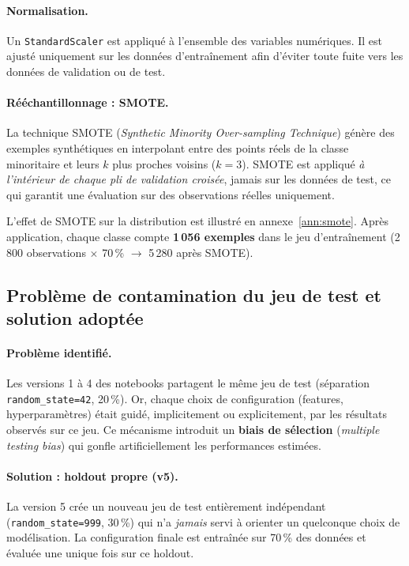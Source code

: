 \documentclass[12pt,a4paper]{article}
\begin{document}
\paragraph{Normalisation.}
Un \texttt{StandardScaler} est appliqué à l'ensemble des variables numériques.
Il est ajusté uniquement sur les données d'entraînement afin d'éviter toute fuite
vers les données de validation ou de test.

\paragraph{Rééchantillonnage : SMOTE.}
La technique SMOTE (\emph{Synthetic Minority Over-sampling Technique}) génère
des exemples synthétiques en interpolant entre des points réels de la classe
minoritaire et leurs $k$ plus proches voisins ($k=3$).
SMOTE est appliqué \emph{à l'intérieur de chaque pli de validation croisée},
jamais sur les données de test, ce qui garantit une évaluation sur des observations
réelles uniquement.

L'effet de SMOTE sur la distribution est illustré en
annexe~\ref{ann:smote}. Après application, chaque classe compte
\textbf{1\,056 exemples} dans le jeu d'entraînement (2\,800 observations
$\times$ 70\,\% $\rightarrow$ 5\,280 après SMOTE).

\subsection{Problème de contamination du jeu de test et solution adoptée}

\paragraph{Problème identifié.}
Les versions 1 à 4 des notebooks partagent le même jeu de test (séparation
\texttt{random\_state=42}, 20\,\%). Or, chaque choix de configuration
(features, hyperparamètres) était guidé, implicitement ou explicitement, par les
résultats observés sur ce jeu. Ce mécanisme introduit un \textbf{biais de sélection}
(\emph{multiple testing bias}) qui gonfle artificiellement les performances
estimées.

\paragraph{Solution : holdout propre (v5).}
La version 5 crée un nouveau jeu de test entièrement indépendant
(\texttt{random\_state=999}, 30\,\%) qui n'a \emph{jamais} servi à orienter
un quelconque choix de modélisation. La configuration finale est entraînée
sur 70\,\% des données et évaluée une unique fois sur ce holdout.
\end{document}
